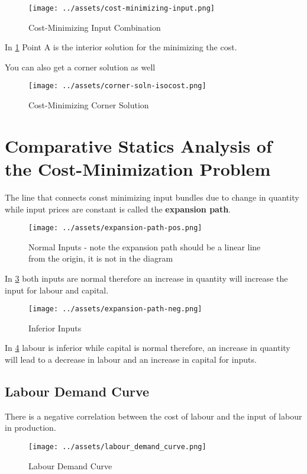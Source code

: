 \documentclass[../ECON-281-Notes.tex]{subfiles}
\begin{document}
\begin{figure}[h]
    \centering
    \texttt{[image: ../assets/cost-minimizing-input.png]}
    \caption{Cost-Minimizing Input Combination}
    \label{fig:cost_min_input}
\end{figure}
In \cref{fig:cost_min_input} Point A is the interior solution for the minimizing the cost.

You can also get a corner solution as well 
\begin{figure}[h]
    \centering
    \texttt{[image: ../assets/corner-soln-isocost.png]}
    \caption{Cost-Minimizing Corner Solution}
    \label{fig:cost_min_corner}
\end{figure}

\section{Comparative Statics Analysis of the Cost-Minimization Problem}
The line that connects const minimizing input bundles due to change in quantity while input prices are constant is called the \textbf{expansion path}.
\begin{figure}[h]
    \centering
    \texttt{[image: ../assets/expansion-path-pos.png]}   
    \caption{Normal Inputs - note the expansion path should be a linear line from the origin, it is not in the diagram}
    \label{fig:normal_inputs}
\end{figure}
In \cref{fig:normal_inputs} both inputs are normal therefore an increase in quantity will increase the input for labour and capital.

\begin{figure}[!h]
    \centering
    \texttt{[image: ../assets/expansion-path-neg.png]}   
    \caption{Inferior Inputs}
    \label{fig:inferior_inputs}
\end{figure}
In \cref{fig:inferior_inputs} labour is inferior while capital is normal therefore, an increase in quantity will lead to a decrease in labour and an increase in capital for inputs. 
\newpage
\subsection{Labour Demand Curve}
There is a negative correlation between the cost of labour and the input of labour in production.

\begin{figure}[!h]
    \centering
    \texttt{[image: ../assets/labour\_demand\_curve.png]}   
    \caption{Labour Demand Curve}
    \label{fig:labour_demand_curve}
\end{figure}
\end{document}
